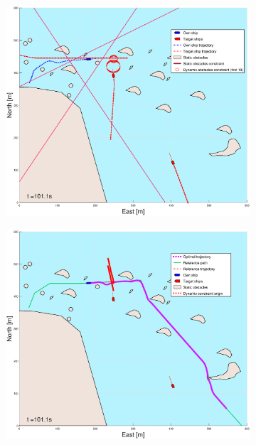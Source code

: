 \begin{figure}[ht]\ContinuedFloat
    \begin{subfigure}[b]{0.49\textwidth}
        \centering
        \includegraphics[width=\textwidth]{Images/Figures/skjergard_m_trafikk_NEW/_Simple_0fig1_time=101}
    \end{subfigure}
    \hfill
    \begin{subfigure}[b]{0.499\textwidth}
        \centering
        \includegraphics[width=\textwidth]{Images/Figures/skjergard_m_trafikk_NEW/_Simple_0fig999_time=101}

\end{subfigure}
\end{figure}
